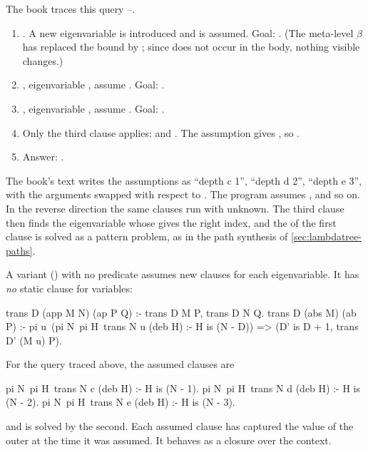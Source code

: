{{\begin{tutorial}
The book traces this query --.
\begin{enumerate}[nosep]
  \item {}. A new eigenvariable  is introduced and  is assumed. Goal:
        . (The meta-level $\beta$ has replaced the bound  by ; since
         does not occur in the body, nothing visible changes.)
  \item {}, eigenvariable , assume . Goal: .
  \item {}, eigenvariable , assume . Goal: .
  \item Only the third clause applies:  and . The assumption gives
        , so .
  \item Answer: .
\end{enumerate}
The book's text writes the assumptions as \enquote{depth c 1}, \enquote{depth d 2}, \enquote{depth e 3}, with the
arguments swapped with respect to . The program assumes , and so on.
In the reverse direction the same clauses run with  unknown. The third clause then finds the eigenvariable
 whose  gives the right index, and the  of the first clause is solved as a pattern
problem, as in the path synthesis of \cref{sec:lambdatree-paths}.
\end{tutorial}

A variant () with no  predicate assumes new  clauses for each
eigenvariable. It has \emph{no} static clause for variables:
\begin{lprolog}
trans D (app M N) (ap P Q) :- trans D M P, trans D N Q.
trans D (abs M) (ab P) :-
   pi u\
     (pi N\ pi H\ trans N u (deb H) :- H is (N - D))
       => (D' is D + 1, trans D' (M u) P).
\end{lprolog}
For the query traced above, the assumed clauses are
\begin{lprolog}
pi N\ pi H\ trans N c (deb H) :- H is (N - 1).
pi N\ pi H\ trans N d (deb H) :- H is (N - 2).
pi N\ pi H\ trans N e (deb H) :- H is (N - 3).
\end{lprolog}
and  is solved by the second. Each assumed clause has captured the value of the outer
\lp{D} at the time it was assumed. It behaves as a closure over the context.

}}
